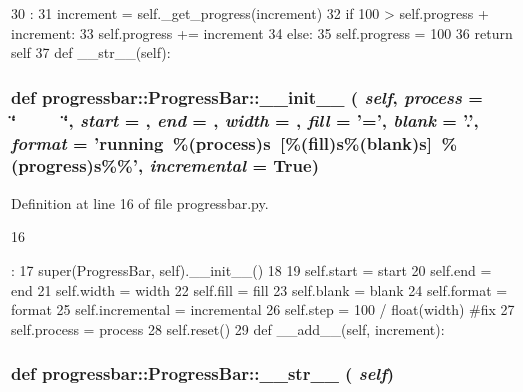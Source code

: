 \begin{DoxyCode}
30                                 :
31         increment = self._get_progress(increment)
32         if 100 > self.progress + increment:
33             self.progress += increment
34         else:
35             self.progress = 100
36         return self
37     
    def __str__(self):
\end{DoxyCode}
\hypertarget{classprogressbar_1_1ProgressBar_a7ad95b3ae7b580117dd48355a3e967ae}{
\subsubsection[{\_\-\_\-init\_\-\_\-}]{\setlength{\rightskip}{0pt plus 5cm}def progressbar::ProgressBar::\_\-\_\-init\_\-\_\- ( {\em self}, \/   {\em process} = {\ttfamily \char`\"{}~~~~~\char`\"{}}, \/   {\em start} = {}, \/   {\em end} = {}, \/   {\em width} = {}, \/   {\em fill} = {\ttfamily '='}, \/   {\em blank} = {\ttfamily '.'}, \/   {\em format} = {\ttfamily 'running~\%({\bf process})s~\mbox{[}\%({\bf fill})s\%({\bf blank})s\mbox{]}~\%({\bf progress})s\%\%'}, \/   {\em incremental} = {\ttfamily True})}}
\label{classprogressbar_1_1ProgressBar_a7ad95b3ae7b580117dd48355a3e967ae}


Definition at line 16 of file progressbar.py.


\begin{DoxyCode}
16                                                                                  
                                                                                       
              :
17         super(ProgressBar, self).__init__()
18 
19         self.start = start
20         self.end = end
21         self.width = width
22         self.fill = fill
23         self.blank = blank
24         self.format = format
25         self.incremental = incremental
26         self.step = 100 / float(width) #fix
27         self.process = process
28         self.reset()
29 
    def __add__(self, increment):
\end{DoxyCode}
\hypertarget{classprogressbar_1_1ProgressBar_ad7acb97d5893c7c67d9e1c8224364df9}{
\subsubsection[{\_\-\_\-str\_\-\_\-}]{\setlength{\rightskip}{0pt plus 5cm}def progressbar::ProgressBar::\_\-\_\-str\_\-\_\- ( {\em self})}}
\label{classprogressbar_1_1ProgressBar_ad7acb97d5893c7c67d9e1c8224364df9}


